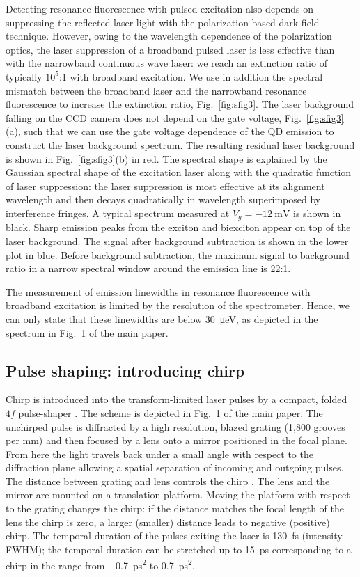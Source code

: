 \documentclass[aps,prl,reprint,superscriptaddress]{revtex4-1}
\begin{document}
Detecting resonance fluorescence with pulsed excitation also depends on suppressing the reflected laser light with the polarization-based dark-field technique. However, owing to the wavelength dependence of the polarization optics, the laser suppression of a broadband pulsed laser is less effective than with the narrowband continuous wave laser: we reach an extinction ratio of typically $10^5$:1 with broadband excitation. We use in addition the spectral mismatch between the broadband laser and the narrowband resonance fluorescence to increase the extinction ratio, Fig.\ \ref{fig:sfig3}. The laser background falling on the CCD camera does not depend on the gate voltage, Fig.\ \ref{fig:sfig3}(a), such that we can use the gate voltage dependence of the QD emission to construct the laser background spectrum. The resulting residual laser background is shown in Fig.\ \ref{fig:sfig3}(b) in red. The spectral shape is explained by the Gaussian spectral shape of the excitation laser along with the quadratic function of laser suppression: the laser suppression is most effective at its alignment wavelength and then decays quadratically in wavelength superimposed by interference fringes. A typical spectrum measured at $V_g=\SI{-12}{\milli\volt}$ is shown in black. Sharp emission peaks from the exciton and biexciton appear on top of the laser background. The signal after background subtraction is shown in the lower plot in blue. Before background subtraction, the maximum signal to background ratio in a narrow spectral window around the emission line is 22:1.

The measurement of emission linewidths in resonance fluorescence with broadband excitation is limited by the resolution of the spectrometer. Hence, we can only state that these linewidths are below \SI{30}{\micro\electronvolt}, as depicted in the spectrum in Fig.\ 1 of the main paper.


\subsection{Pulse shaping: introducing chirp}\label{sec:pulseshaper}
Chirp is introduced into the transform-limited laser pulses by a compact, folded $4f$ pulse-shaper \cite{Martinez1987,Weiner1992}. The scheme is depicted in Fig.\ 1 of the main paper. The unchirped pulse is diffracted by a high resolution, blazed grating (1,800 grooves per mm) and then focused by a lens onto a mirror positioned in the focal plane. From here the light travels back under a small angle with respect to the diffraction plane allowing a spatial separation of incoming and outgoing pulses. The distance between grating and lens controls the chirp \cite{Martinez1987}. The lens and the mirror are mounted on a translation platform. Moving the platform with respect to the grating changes the chirp: if the distance matches the focal length of the lens the chirp is zero, a larger (smaller) distance leads to negative (positive) chirp. The temporal duration of the pulses exiting the laser is \SI{130}{\femto\second} (intensity FWHM); the temporal duration can be stretched up to \SI{15}{\pico\second} corresponding to a chirp in the range from \SI{-0.7}{\pico\second\squared} to \SI{+0.7}{\pico\second\squared}. 
\end{document}
